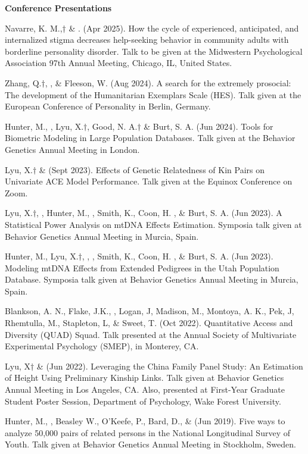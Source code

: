 {\large {\bf Conference Presentations}}
\begin{etaremune}

\item Navarre, K. M.,$\dagger$ \& \meb. (Apr 2025). How the cycle of experienced, anticipated, and internalized stigma decreases help-seeking behavior in community adults with borderline personality disorder. Talk to be given at the Midwestern Psychological Association 97th Annual Meeting, Chicago, IL, United States.
\item Zhang, Q.$\dagger$, \meb, \&  Fleeson, W. (Aug 2024). A search for the extremely prosocial: The development of the Humanitarian Exemplars Scale (HES). Talk given at the European Conference of Personality in Berlin, Germany.
\item Hunter, M., \meb, Lyu, X.$\dagger$, Good, N. A.$\dagger$ \& Burt, S. A. (Jun 2024). Tools for Biometric Modeling in Large Population Databases. Talk given at the Behavior Genetics Annual Meeting in London.
\item Lyu, X.$\dagger$ \& \meb (Sept 2023). Effects of Genetic Relatedness of Kin Pairs on Univariate ACE Model Performance. Talk given at the Equinox Conference on Zoom.
\item Lyu, X.$\dagger$, \meb, Hunter, M.,  \Joe, Smith, K., Coon, H. , \& Burt, S. A. (Jun 2023). A Statistical Power Analysis on mtDNA Effects Estimation. Symposia talk given at Behavior Genetics Annual Meeting in Murcia, Spain.
\item Hunter, M., Lyu, X.$\dagger$, \meb,  \Joe, Smith, K., Coon, H. , \& Burt, S. A. (Jun 2023). Modeling mtDNA Effects from Extended Pedigrees in the Utah Population Database. Symposia talk given at Behavior Genetics Annual Meeting in Murcia, Spain.
\item  Blankson, A. N., Flake, J.K., \meb, Logan, J, Madison, M., Montoya, A. K., Pek, J, Rhemtulla, M., Stapleton, L, \& Sweet, T. (Oct 2022). Quantitative Access and Diversity (QUAD) Squad. Talk presented at the Annual Society of Multivariate Experimental Psychology (SMEP), in Monterey, CA.
\item Lyu, X$\dagger$ \& \meb (Jun 2022). Leveraging the China Family Panel Study: An Estimation of Height Using Preliminary Kinship Links. Talk given at Behavior Genetics Annual Meeting in Los Angeles, CA. Also, presented at First-Year Graduate Student Poster Session, Department of Psychology, Wake Forest University.
%
\item Hunter, M., \meb, Beasley W., O'Keefe, P.,  Bard, D., \& \Joe (Jun 2019). Five ways to analyze 50,000 pairs of related persons in the National Longitudinal Survey of Youth. Talk given at Behavior Genetics Annual Meeting in Stockholm, Sweden. 

\end{etaremune}
